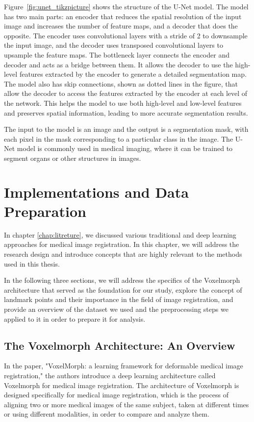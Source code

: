 \documentclass{book}
\begin{document}
	Figure~\ref{fig:unet_tikzpicture} shows the structure of the U-Net model. The model has two main parts: an encoder that reduces the spatial resolution of the input image and increases the number of feature maps, and a decoder that does the opposite. The encoder uses convolutional layers with a stride of 2 to downsample the input image, and the decoder uses transposed convolutional layers to upsample the feature maps. The bottleneck layer connects the encoder and decoder and acts as a bridge between them. It allows the decoder to use the high-level features extracted by the encoder to generate a detailed segmentation map. The model also has skip connections, shown as dotted lines in the figure, that allow the decoder to access the features extracted by the encoder at each level of the network. This helps the model to use both high-level and low-level features and preserves spatial information, leading to more accurate segmentation results.
	
	The input to the model is an image and the output is a segmentation mask, with each pixel in the mask corresponding to a particular class in the image. The U-Net model is commonly used in medical imaging, where it can be trained to segment organs or other structures in images.
	
	\chapter{Implementations and Data Preparation}\label{chap:imp_and_data}
	In chapter \ref{chap:litreture}, we discussed various traditional and deep learning approaches for medical image registration. In this chapter, we will address the research design and introduce concepts that are highly relevant to the methods used in this thesis.
	
	In the following three sections, we will address the specifics of the Voxelmorph architecture \cite{Balakrishnan_2019} that served as the foundation for our study, explore the concept of landmark points and their importance in the field of image registration, and provide an overview of the dataset we used and the preprocessing steps we applied to it in order to prepare it for analysis.
	
	\section{The Voxelmorph Architecture: An Overview}
	\label{sec:vxm_architecture}
	
	In the paper, "VoxelMorph: a learning framework for deformable medical image registration," \cite{Balakrishnan_2019} the authors introduce a deep learning architecture called Voxelmorph for medical image registration. The architecture of Voxelmorph is designed specifically for medical image registration, which is the process of aligning two or more medical images of the same subject, taken at different times or using different modalities, in order to compare and analyze them.
	
\end{document}
